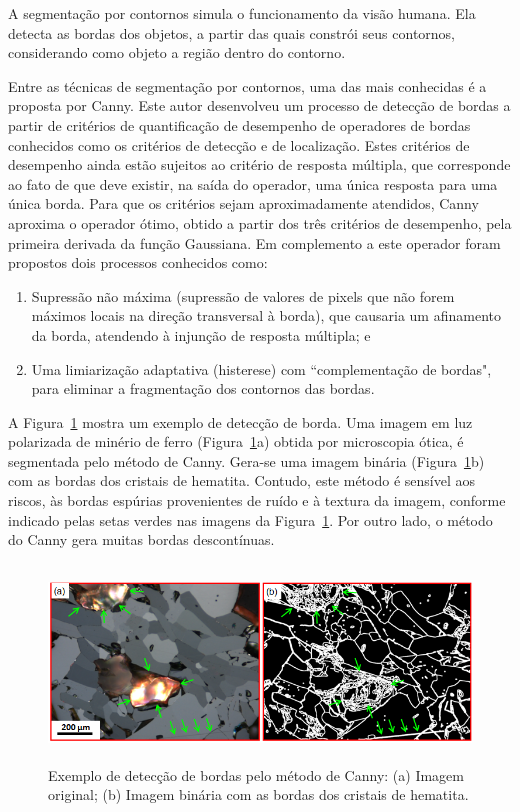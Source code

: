 A segmentação por contornos simula o funcionamento da visão
humana. Ela detecta as bordas dos objetos, a partir das quais constrói
seus contornos, considerando como objeto a região dentro do
contorno.\cite{72}

Entre as técnicas de segmentação por contornos, uma das mais
conhecidas é a proposta por Canny.\cite{100} Este autor desenvolveu um
processo de detecção de bordas a partir de critérios de quantificação
de desempenho de operadores de bordas conhecidos como os critérios de
detecção e de localização. Estes critérios de desempenho ainda estão
sujeitos ao critério de resposta múltipla, que corresponde ao fato de
que deve existir, na saída do operador, uma única resposta para uma
única borda. Para que os critérios sejam aproximadamente atendidos,
Canny aproxima o operador ótimo, obtido a partir dos três critérios de
desempenho, pela primeira derivada da função Gaussiana. Em complemento
a este operador foram propostos dois processos conhecidos como:

\begin{enumerate}[label=(\roman{*})]
  \item Supressão não máxima (supressão de valores de pixels que não
    forem máximos locais na direção transversal à borda), que causaria
    um afinamento da borda, atendendo à injunção de resposta múltipla; e
  \item Uma limiarização adaptativa (histerese) com ``complementação
    de bordas", para eliminar a fragmentação dos contornos das
    bordas.\cite{109}
\end{enumerate}

A Figura~\ref{fig:seg-canny} mostra um exemplo de detecção de
borda. Uma imagem em luz polarizada de minério de ferro
(Figura~\ref{fig:seg-canny}a) obtida por microscopia ótica, é
segmentada pelo método de Canny. Gera-se uma imagem binária
(Figura~\ref{fig:seg-canny}b) com as bordas dos cristais de
hematita. Contudo, este método é sensível aos riscos, às bordas
espúrias provenientes de ruído e à textura da imagem, conforme
indicado pelas setas verdes nas imagens da
Figura~\ref{fig:seg-canny}. Por outro lado, o método do Canny gera
muitas bordas descontínuas.

\begin{figure} [h]
  \begin{center}
    \includegraphics[height=148pt,width=400pt]{images/fig_seg-canny}
    \caption{Exemplo de detecção de bordas pelo método de Canny: (a)
      Imagem original; (b) Imagem binária com as bordas dos cristais
      de hematita.}\label{fig:seg-canny}
  \end{center}
\end{figure}

